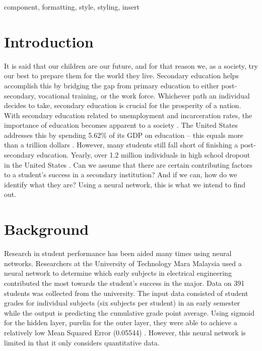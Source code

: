 \documentclass[conference]{IEEEtran}
\begin{document}

\begin{IEEEkeywords}
component, formatting, style, styling, insert
\end{IEEEkeywords}

\section{Introduction}

It is said that our children are our future, and for that reason we, as a society, try our best to prepare them for the world they live. Secondary education helps accomplish this by bridging the gap from primary education to either post-secondary, vocational training, or the work force. Whichever path an individual decides to take, secondary education is crucial for the prosperity of a nation. With secondary education related to unemployment and incarceration rates, the importance of education becomes apparent to a society \cite{mitra}. The United States addresses this by spending 5.62\% of its GDP on education -- this equals more than a trillion dollars \cite{nationmaster}. However, many students still fall short of finishing a post-secondary education. Yearly, over 1.2 million individuals in high school dropout in the United States \cite{miller2011}. Can we assume that there are certain contributing factors to a student's success in a secondary institution? And if we can, how do we identify what they are?  Using a neural network, this is what we intend to find out. 

\section{Background}

Research in student performance has been aided many times using neural networks. Researchers at the University of Technology Mara Malaysia used a neural network to determine which early subjects in electrical engineering contributed the most towards the student’s success in the major. Data on 391 students was collected from the university. The input data consisted of student grades for individual subjects (six subjects per student) in an early semester while the output is predicting the cumulative grade point average. Using sigmoid for the hidden layer, purelin for the outer layer, they were able to achieve a relatively low Mean Squared Error (0.05544) \cite{arsad2013}. However, this neural network is limited in that it only considers quantitative data. 
\end{document}
